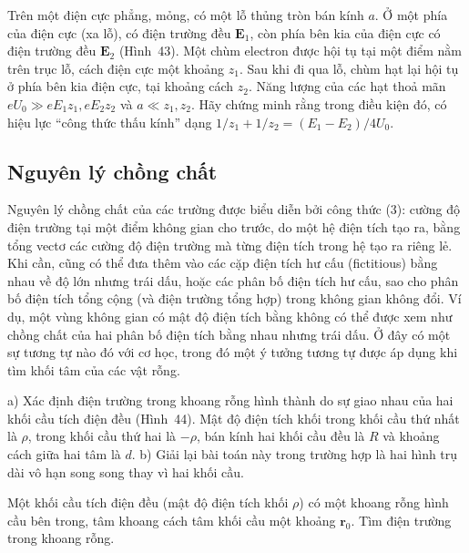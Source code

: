  Trên một điện cực phẳng, mỏng, có một lỗ thủng tròn bán kính $a$. Ở một phía của điện cực (xa lỗ), có điện trường đều $\mathbf{E}_1$, còn phía bên kia của điện cực có điện trường đều $\mathbf{E}_2$ (Hình~43). Một chùm electron được hội tụ tại một điểm nằm trên trục lỗ, cách điện cực một khoảng $z_1$. Sau khi đi qua lỗ, chùm hạt lại hội tụ ở phía bên kia điện cực, tại khoảng cách $z_2$. Năng lượng của các hạt thoả mãn $eU_0 \gg eE_1z_1, eE_2z_2$ và $a \ll z_1, z_2$. Hãy chứng minh rằng trong điều kiện đó, có hiệu lực ``công thức thấu kính'' dạng $1/z_1+1/z_2=(E_1-E_2)/4U_0$. 

\subsection{Nguyên lý chồng chất}

Nguyên lý chồng chất của các trường được biểu diễn bởi công thức (3): cường độ điện trường tại một điểm không gian cho trước, do một hệ điện tích tạo ra, bằng tổng vectơ các cường độ điện trường mà từng điện tích trong hệ tạo ra riêng lẻ. Khi cần, cũng có thể đưa thêm vào các cặp điện tích hư cấu (fictitious) bằng nhau về độ lớn nhưng trái dấu, hoặc các phân bố điện tích hư cấu, sao cho phân bố điện tích tổng cộng (và điện trường tổng hợp) trong không gian không đổi. Ví dụ, một vùng không gian có mật độ điện tích bằng không có thể được xem như chồng chất của hai phân bố điện tích bằng nhau nhưng trái dấu. Ở đây có một sự tương tự nào đó với cơ học, trong đó một ý tưởng tương tự được áp dụng khi tìm khối tâm của các vật rỗng.

 a) Xác định điện trường trong khoang rỗng hình thành do sự giao nhau của hai khối cầu tích điện đều (Hình~44). Mật độ điện tích khối trong khối cầu thứ nhất là $\rho$, trong khối cầu thứ hai là $-\rho$, bán kính hai khối cầu đều là $R$ và khoảng cách giữa hai tâm là $d$. b) Giải lại bài toán này trong trường hợp là hai hình trụ dài vô hạn song song thay vì hai khối cầu.


 Một khối cầu tích điện đều (mật độ điện tích khối $\rho$) có một khoang rỗng hình cầu bên trong, tâm khoang cách tâm khối cầu một khoảng $\mathbf{r}_0$. Tìm điện trường trong khoang rỗng.

